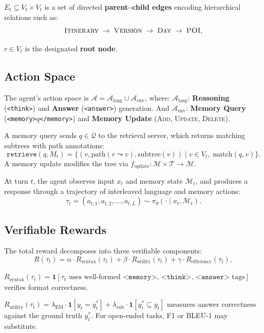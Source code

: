 \documentclass{article}
\theoremstyle{definition}
\begin{document}
 $E_t \subseteq V_t \times V_t$ is a set of directed \textbf{parent--child edges} encoding hierarchical relations such as:
\[
\textsc{Itinerary} \;\to\; \textsc{Version} \;\to\; \textsc{Day} \;\to\; \textsc{POI},
\]

$r \in V_t$ is the designated \textbf{root node}.

\subsection{Action Space}

The agent's action space is $\mathcal{A} = \mathcal{A}_{\text{lang}} \cup \mathcal{A}_{\text{env}}$, where:
$\mathcal{A}_{\text{lang}}$: \textbf{Reasoning} (\texttt{<think>}) and \textbf{Answer} (\texttt{<answer>}) generation.
And $\mathcal{A}_{\text{env}}$: \textbf{Memory Query} (\texttt{<memory>}$q$\texttt{</memory>}) and \textbf{Memory Update} (\textsc{Add}, \textsc{Update}, \textsc{Delete}).

A memory query sends $q \in \mathcal{Q}$ to the retrieval server, which returns matching subtrees with path annotations:
\[
\texttt{retrieve}(q, M_t) = \bigl\{(v, \text{path}(r \leadsto v), \text{subtree}(v)) \;\big|\; v \in V_t,\; \text{match}(q, v)\bigr\}.
\]
A memory update modifies the tree via $f_{\text{update}}: \mathcal{M} \times \mathcal{T} \to \mathcal{M}$.

At turn $t$, the agent observes input $x_t$ and memory state $\mathcal{M}_t$, and produces a response through a trajectory of interleaved language and memory actions:
\[
\tau_t = (a_{t,1}, a_{t,2}, \ldots, a_{t,L}) \sim \pi_\theta(\cdot \mid x_t, \mathcal{M}_t).
\]

\subsection{Verifiable Rewards}

The total reward decomposes into three verifiable components:
\[
R(\tau_t) = \alpha \cdot R_{\text{syntax}}(\tau_t) + \beta \cdot R_{\text{utility}}(\tau_t) + \gamma \cdot R_{\text{efficiency}}(\tau_t),
\]


$R_{\text{syntax}}(\tau_t) = \mathbf{1}[\tau_t \text{ uses well-formed } \texttt{<memory>}\text{, } \texttt{<think>}\text{, } \texttt{<answer>} \text{ tags}]$ verifies format correctness.

$R_{\text{utility}}(\tau_t) = \lambda_{\text{EM}} \cdot \mathbf{1}[y_t = y_t^*] + \lambda_{\text{sub}} \cdot \mathbf{1}[y_t^* \subseteq y_t]$ measures answer correctness against the ground truth $y_t^*$. For open-ended tasks, F1 or BLEU-1 may substitute.
\end{document}
